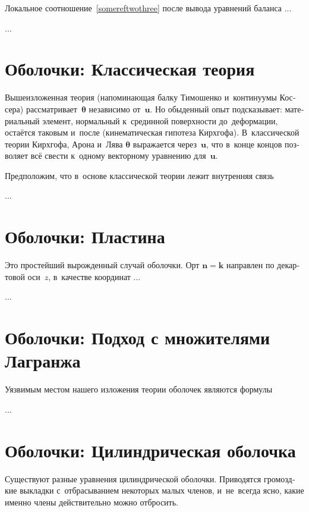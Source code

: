 \begin{otherlanguage}{russian}

Локальное соотношение~\eqref{somereftwothree} после вывода уравнений баланса ...

...



\section{Оболочки: Классическая теория}

Вышеизложенная теория (напоминающая балку Тимошенко и~континуумы Коссера) рассматривает~$\bm{\theta}$ независимо от~$\bm{u}$. Но обыденный опыт подсказывает: материальный элемент, нормальный к~срединной поверхности до~деформации, остаётся таковым и~после (кинематическая гипотеза Кирхгофа). В~классической теории Кирхгофа, Арона и~Лява $\bm{\theta}$ выражается через~$\bm{u}$, что в~конце концов позволяет всё свести к~одному векторному уравнению для~$\bm{u}$.

Предположим, что в~основе классической теории лежит внутренняя связь

...



\section{Оболочки: Пластина}

Это простейший вырожденный случай оболочки. Орт ${\bm{n} = \bm{k}}$ направлен по декартовой оси~$z$, в~качестве координат ...

...



\section{Оболочки: Подход с множителями Лагранжа}

Уязвимым местом нашего изложения теории оболочек являются формулы

...



\section{Оболочки: Цилиндрическая оболочка}

Существуют разные уравнения цилиндрической оболочки. Приводятся громоздкие выкладки с~отбрасыванием некоторых малых членов, и~не~всегда ясно, какие именно члены действительно можно отбросить.


\end{otherlanguage}
